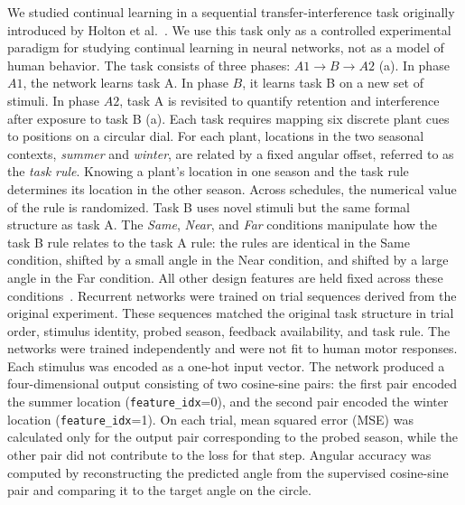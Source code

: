 \documentclass{article}
\theoremstyle{plain}
\theoremstyle{definition}
\theoremstyle{remark}
\begin{document}
        We studied continual learning in a sequential transfer-interference task originally introduced by Holton et al.~\cite{holton2025humans}. We use this task only as a controlled experimental paradigm for studying continual learning in neural networks, not as a model of human behavior. The task consists of three phases: \(A1 \rightarrow B \rightarrow A2\) (a). In phase \(A1\), the network learns task A. In phase \(B\), it learns task B on a new set of stimuli. In phase \(A2\), task A is revisited to quantify retention and interference after exposure to task B (a). Each task requires mapping six discrete plant cues to positions on a circular dial. For each plant, locations in the two seasonal contexts, \emph{summer} and \emph{winter}, are related by a fixed angular offset, referred to as the \emph{task rule}. Knowing a plant's location in one season and the task rule determines its location in the other season. Across schedules, the numerical value of the rule is randomized. Task B uses novel stimuli but the same formal structure as task A. The \emph{Same}, \emph{Near}, and \emph{Far} conditions manipulate how the task B rule relates to the task A rule: the rules are identical in the Same condition, shifted by a small angle in the Near condition, and shifted by a large angle in the Far condition. All other design features are held fixed across these conditions~\cite{holton2025humans}. Recurrent networks were trained on trial sequences derived from the original experiment. These sequences matched the original task structure in trial order, stimulus identity, probed season, feedback availability, and task rule. The networks were trained independently and were not fit to human motor responses. Each stimulus was encoded as a one-hot input vector. The network produced a four-dimensional output consisting of two cosine-sine pairs: the first pair encoded the summer location (\texttt{feature\_idx}=0), and the second pair encoded the winter location (\texttt{feature\_idx}=1). On each trial, mean squared error (MSE) was calculated only for the output pair corresponding to the probed season, while the other pair did not contribute to the loss for that step. Angular accuracy was computed by reconstructing the predicted angle from the supervised cosine-sine pair and comparing it to the target angle on the circle.
        
\end{document}
